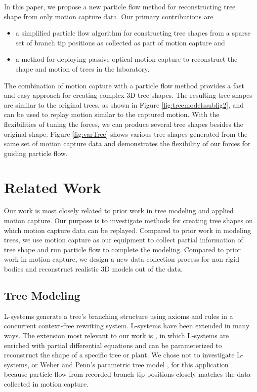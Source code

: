 In this paper, we propose a new particle flow method for reconstructing tree shape from only motion capture data. Our primary contributions are 
\begin{itemize}
	\item {a simplified particle flow algorithm for constructing tree shapes from a sparse set of branch tip positions as collected as part of motion capture and}
	\item {a method for deploying passive optical motion capture to reconstruct the shape and motion of trees in the laboratory. }
\end{itemize}

The combination of motion capture with a particle flow method provides a fast and easy approach for creating complex 3D tree shapes. The resulting tree shapes are similar to the original trees, as shown in Figure \ref{fig:treemodelssubfig2}, and can be used to replay motion similar to the captured motion. With the flexibilities of tuning the forces, we can produce several tree shapes besides the original shape. Figure \ref{fig:varTree} shows various tree shapes generated from the same set of motion capture data and demonstrates the flexibility of our forces for guiding particle flow.

\section{Related Work}

Our work is most closely related to prior work in tree modeling and applied motion capture. Our purpose is to investigate methods for creating tree shapes on which motion capture data can be replayed. Compared to prior work in modeling trees, we use motion capture as our equipment to collect partial information of tree shape and run particle flow to complete the modeling. Compared to prior work in motion capture, we design a new data collection process for non-rigid bodies and reconstruct realistic 3D models out of the data.

\subsection{Tree Modeling}

L-systems \cite{lindenmayer68} generate a tree's branching structure using axioms and rules in a concurrent context-free rewriting system. L-systems have been extended in many ways. The extension most relevant to our work is \cite{Prusinkiewicz:2001}, in which L-systems are enriched with partial differential equations and can be parameterized to reconstruct the shape of a specific tree or plant.  We chose not to investigate L-systems, or Weber and Penn's parametric tree model \cite{Weber1995}, for this application because particle flow from recorded branch tip positions closely matches the data collected in motion capture.  

